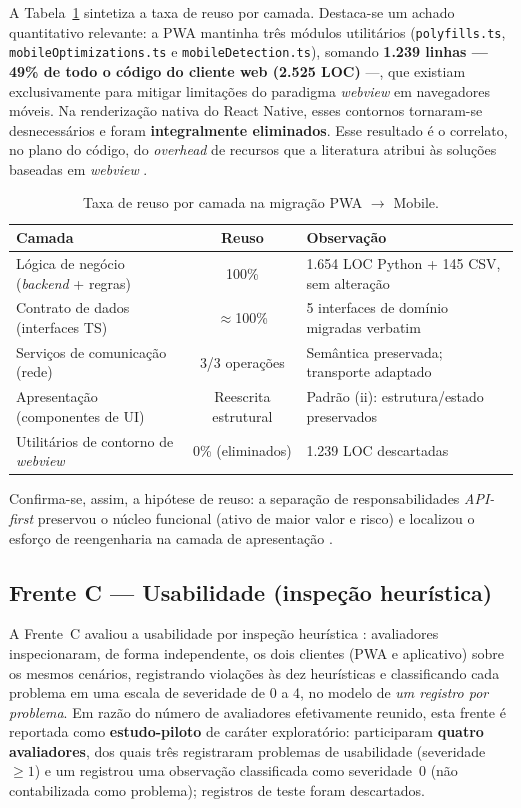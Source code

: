 \documentclass[12pt]{article}
\begin{document}
A Tabela~\ref{tab:taxa_reuso} sintetiza a taxa de reuso por camada. Destaca-se um
achado quantitativo relevante: a PWA mantinha três módulos utilitários
(\texttt{polyfills.ts}, \texttt{mobileOptimizations.ts} e
\texttt{mobileDetection.ts}), somando \textbf{1.239 linhas --- 49\% de todo o
código do cliente web (2.525 LOC)} ---, que existiam exclusivamente para mitigar
limitações do paradigma \emph{webview} em navegadores móveis. Na renderização
nativa do React Native, esses contornos tornaram-se desnecessários e foram
\textbf{integralmente eliminados}. Esse resultado é o correlato, no plano do
código, do \emph{overhead} de recursos que a literatura atribui às soluções
baseadas em \emph{webview} \cite{oliveira2023}.

\begin{table}[H]
\centering
\caption{Taxa de reuso por camada na migração PWA $\rightarrow$ Mobile.}
\label{tab:taxa_reuso}
\footnotesize
\begin{tabular}{|p{4.6cm}|c|p{5.2cm}|}
\hline
\textbf{Camada} & \textbf{Reuso} & \textbf{Observação} \\ \hline
Lógica de negócio (\emph{backend} + regras) & 100\% & 1.654 LOC Python + 145 CSV, sem alteração \\ \hline
Contrato de dados (interfaces TS) & $\approx$100\% & 5 interfaces de domínio migradas verbatim \\ \hline
Serviços de comunicação (rede) & 3/3 operações & Semântica preservada; transporte adaptado \\ \hline
Apresentação (componentes de UI) & Reescrita estrutural & Padrão (ii): estrutura/estado preservados \\ \hline
Utilitários de contorno de \emph{webview} & 0\% (eliminados) & 1.239 LOC descartadas \\ \hline
\end{tabular}
\end{table}

Confirma-se, assim, a hipótese de reuso: a separação de responsabilidades
\emph{API-first} preservou o núcleo funcional (ativo de maior valor e risco) e
localizou o esforço de reengenharia na camada de apresentação
\cite{rampinelli2026, oliveira2023}.

\subsection{Frente C --- Usabilidade (inspeção heurística)}
\label{sub:frenteC}

A Frente~C avaliou a usabilidade por inspeção heurística \cite{nielsen1994,
cardieri2018}: avaliadores inspecionaram, de forma independente, os dois clientes
(PWA e aplicativo) sobre os mesmos cenários, registrando violações às dez
heurísticas e classificando cada problema em uma escala de severidade de 0 a 4, no
modelo de \emph{um registro por problema}. Em razão do número de avaliadores
efetivamente reunido, esta frente é reportada como \textbf{estudo-piloto} de
caráter exploratório: participaram \textbf{quatro avaliadores}, dos quais três
registraram problemas de usabilidade (severidade $\geq 1$) e um registrou uma
observação classificada como severidade~0 (não contabilizada como problema);
registros de teste foram descartados.
\end{document}
